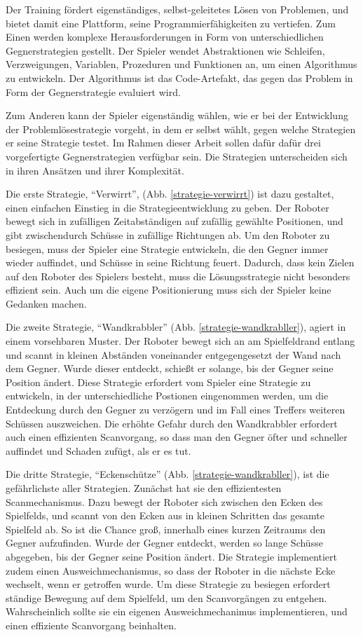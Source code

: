 Der Training fördert eigenständiges, selbst-geleitetes Lösen von Problemen, und bietet damit
eine Plattform, seine Programmierfähigkeiten zu vertiefen. Zum Einen werden komplexe
Herausforderungen in Form von unterschiedlichen Gegnerstrategien gestellt. Der Spieler
wendet Abstraktionen wie Schleifen, Verzweigungen, Variablen, Prozeduren und Funktionen an, um einen
Algorithmus zu entwickeln. Der Algorithmus ist das Code-Artefakt, das gegen das Problem in Form der 
Gegnerstrategie evaluiert wird.

Zum Anderen kann der Spieler eigenständig wählen, wie er bei der Entwicklung der
Problemlösestrategie vorgeht, in dem er selbst wählt, gegen welche Strategien er seine Strategie
testet. Im Rahmen dieser Arbeit sollen dafür dafür drei vorgefertigte Gegnerstrategien verfügbar
sein. Die Strategien unterscheiden sich in ihren Ansätzen und ihrer Komplexität.

Die erste Strategie, \enquote{Verwirrt}, (Abb. \ref{strategie-verwirrt}) ist dazu gestaltet, einen
einfachen Einstieg in die Strategieentwicklung zu geben. Der Roboter bewegt sich in zufälligen
Zeitabständigen auf zufällig gewählte Positionen, und gibt zwischendurch Schüsse in zufällige
Richtungen ab. Um den Roboter zu besiegen, muss der Spieler eine Strategie entwickeln, die den
Gegner immer wieder auffindet, und Schüsse in seine Richtung feuert. Dadurch, dass kein
Zielen auf den Roboter des Spielers besteht, muss die Lösungsstrategie nicht besonders effizient
sein. Auch um die eigene Positionierung muss sich der Spieler keine Gedanken machen.

Die zweite Strategie, \enquote{Wandkrabbler} (Abb. \ref{strategie-wandkrabller}), agiert in einem
vorsehbaren Muster. Der Roboter bewegt sich an am Spielfeldrand entlang und scannt in kleinen
Abständen voneinander entgegengesetzt der Wand nach dem Gegner. Wurde dieser entdeckt, schießt er
solange, bis der Gegner seine Position ändert. Diese Strategie erfordert vom Spieler eine Strategie
zu entwickeln, in der unterschiedliche Postionen eingenommen werden, um die Entdeckung durch den
Gegner zu verzögern und im Fall eines Treffers weiteren Schüssen auszweichen. Die erhöhte Gefahr
durch den Wandkrabbler erfordert auch einen effizienten Scanvorgang, so dass man den Gegner öfter
und schneller auffindet und Schaden zufügt, als er es tut.

Die dritte Strategie, \enquote{Eckenschütze} (Abb. \ref{strategie-wandkrabller}), ist die
gefährlichste aller Strategien. Zunächst hat sie den effizientesten Scanmechanismus. Dazu bewegt der
Roboter sich zwischen den Ecken des Spielfelds, und scannt von den Ecken aus in kleinen Schritten
das gesamte Spielfeld ab. So ist die Chance groß, innerhalb eines kurzen Zeitraums den Gegner
aufzufinden. Wurde der Gegner entdeckt, werden so lange Schüsse abgegeben, bis der Gegner seine
Position ändert. Die Strategie implementiert zudem einen Ausweichmechanismus, so dass der Roboter in die
nächste Ecke wechselt, wenn er getroffen wurde. Um diese Strategie zu besiegen erfordert ständige
Bewegung auf dem Spielfeld, um den Scanvorgängen zu entgehen. Wahrscheinlich sollte sie ein eigenen
Ausweichmechanimus implementieren, und einen effiziente Scanvorgang beinhalten.

